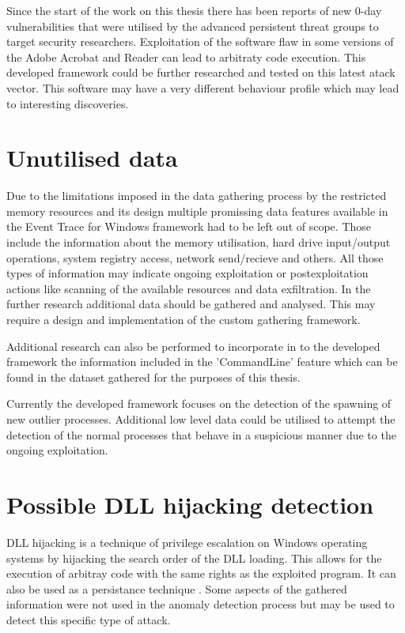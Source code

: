 \documentclass[a4paper,twoside,12pt]{book}
\begin{document}
Since the start of the work on this thesis there has been reports of new 0-day vulnerabilities that were
utilised by the advanced persistent threat groups to target security researchers. Exploitation of the
software flaw in some versions of the Adobe Acrobat and Reader can lead to arbitraty code execution\cite{bib:AdobeExploit}.
This developed framework could be further researched and tested on this latest atack vector. This 
software may have a very different behaviour profile which may lead to interesting discoveries.

\section{Unutilised data}

Due to the limitations imposed in the data gathering process by the restricted memory resources and its
design multiple promissing data features available in the Event Trace for Windows framework had to be
left out of scope. Those include the information about the memory utilisation, hard drive input/output 
operations, system registry access, network send/recieve and others. All those types of information
may indicate ongoing exploitation or postexploitation actions like scanning of the available resources
and data exfiltration. In the further research additional 
data should be gathered and analysed. This may require a design and implementation of the custom  
gathering framework.

Additional research can also be performed to incorporate in to the developed framework the 
information included in the 'CommandLine' feature which can be found in the dataset gathered for the purposes
of this thesis.

Currently the developed framework focuses on the detection of the spawning of new outlier processes.
Additional low level data could be utilised to attempt the detection of the normal processes that behave
in a suspicious manner due to the ongoing exploitation.

\section{Possible DLL hijacking detection}

DLL hijacking is a technique of privilege escalation on Windows operating systems by hijacking the 
search order of the DLL loading. This allows for the execution of arbitray code with the same rights 
as the exploited program. It can also be used as a persistance technique \cite{bib:DLLhijacking}.
Some aspects of the gathered information were not used in the anomaly detection process but may be
used to detect this specific type of attack. 
\end{document}
